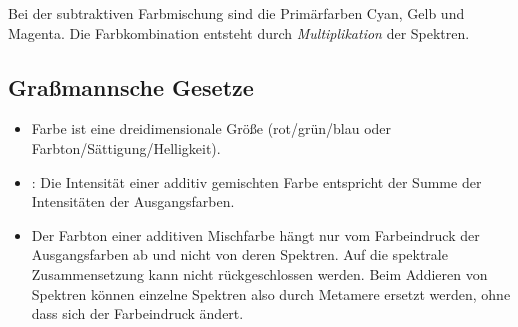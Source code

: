 Bei der subtraktiven Farbmischung sind die Primärfarben Cyan, Gelb und Magenta.
Die Farbkombination entsteht durch \emph{Multiplikation} der Spektren.

\subsection{Graßmannsche Gesetze}
\begin{itemize}
	\item Farbe ist eine dreidimensionale Größe (\zB rot/grün/blau oder Farbton/Sättigung/Helligkeit).
	\item {}:
	Die Intensität einer additiv gemischten Farbe entspricht der Summe der Intensitäten der Ausgangsfarben.
	\item Der Farbton einer additiven Mischfarbe hängt nur vom Farbeindruck der Ausgangsfarben ab und nicht von deren Spektren.
	Auf die spektrale Zusammensetzung kann nicht rückgeschlossen werden.
	Beim Addieren von Spektren können einzelne Spektren also durch Metamere ersetzt werden, ohne dass sich der Farbeindruck ändert.
\end{itemize}
